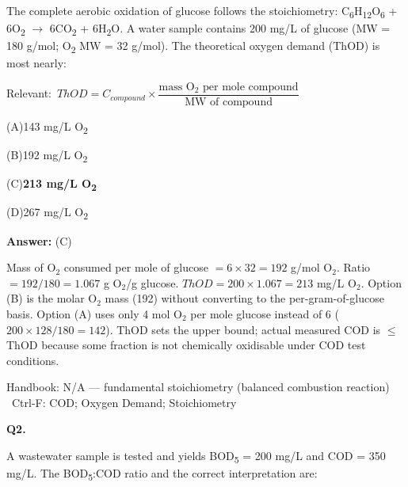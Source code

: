 \documentclass[11pt]{article}
\newcommand{\correct}[1]{\textbf{#1}\;{\color{accent}$\checkmark$}}
\newcommand{\optline}[2]{\par\noindent\hspace{1.2em}(#1)\hspace{0.6em}#2}
\begin{document}
The complete aerobic oxidation of glucose follows the stoichiometry: C\textsubscript{6}H\textsubscript{1}\textsubscript{2}O\textsubscript{6} + 6O\textsubscript{2} $\rightarrow$ 6CO\textsubscript{2} + 6H\textsubscript{2}O. A water sample contains 200 mg/L of glucose (MW = 180 g/mol; O\textsubscript{2} MW = 32 g/mol). The theoretical oxygen demand (ThOD) is most nearly:\par\vspace{3pt}
{\small\color{soft}Relevant:}\ $ThOD = C_{compound}\times\dfrac{\text{mass O}_2\text{ per mole compound}}{\text{MW of compound}}$\par\vspace{3pt}
\optline{A}{143 mg/L O\textsubscript{2}}
\optline{B}{192 mg/L O\textsubscript{2}}
\optline{C}{\correct{213 mg/L O\textsubscript{2}}}
\optline{D}{267 mg/L O\textsubscript{2}}
\par\vspace{3pt}
\vspace{2pt}\par\noindent\colorbox{boxbg}{\parbox{\dimexpr\linewidth-2\fboxsep\relax}{%
\vspace{2pt}\textbf{Answer:} (C)\par\vspace{2pt}
{\small Mass of O$_2$ consumed per mole of glucose $= 6\times32 = 192$ g/mol O$_2$.  Ratio $= 192/180 = 1.067$ g O$_2$/g glucose.  $ThOD = 200\times1.067 = 213$ mg/L O$_2$. Option (B) is the molar O$_2$ mass (192) without converting to the per-gram-of-glucose basis. Option (A) uses only 4 mol O$_2$ per mole glucose instead of 6 ($200\times128/180 = 142$). ThOD sets the upper bound; actual measured COD is $\leq$ThOD because some fraction is not chemically oxidisable under COD test conditions.}\par\vspace{2pt}
{\footnotesize\color{soft}Handbook: N/A --- fundamental stoichiometry (balanced combustion reaction) \textbullet\ Ctrl-F: COD; Oxygen Demand; Stoichiometry}\vspace{2pt}
}}
\vspace{9pt}
\filbreak
\textbf{\color{accent}Q2.}\par\vspace{2pt}
A wastewater sample is tested and yields BOD\textsubscript{5} = 200 mg/L and COD = 350 mg/L. The BOD\textsubscript{5}:COD ratio and the correct interpretation are:\par\vspace{3pt}
\end{document}

